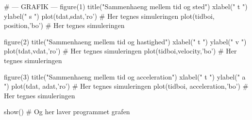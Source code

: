 \documentclass[12pt]{article}
\begin{document}
\begin{python}
        # --- GRAFIK ---
        figure(1)
        title("Sammenhaeng mellem tid og sted")
        xlabel(" t ")
        ylabel(" s ")
        plot(tdat,sdat,'ro')    # Her tegnes simuleringen
        plot(tidboi, position,'bo')    # Her tegnes simuleringen

        figure(2)
        title("Sammenhaeng mellem tid og hastighed")
        xlabel(" t ")
        ylabel(" v ")
        plot(tdat,vdat,'ro')    # Her tegnes simuleringen
        plot(tidboi,velocity,'bo')    # Her tegnes simuleringen

        figure(3)
        title("Sammenhaeng mellem tid og acceleration")
        xlabel(" t ")
        ylabel(" a ")
        plot(tdat, adat,'ro')    # Her tegnes simuleringen
        plot(tidboi, acceleration,'bo')    # Her tegnes simuleringen

        show()                  # Og her laver programmet grafen
\end{python}
\end{document}
